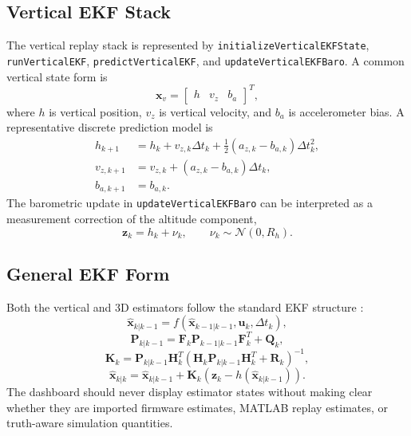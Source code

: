 \documentclass[colorlinks,upint,subscriptcorrection,varvw,hyphenate,balance]{asmeconf}
\newcommand{\code}[1]{\texttt{\allowbreak#1}}
\newcommand{\dt}{\Delta t}
\newcommand{\x}{\mathbf{x}}
\newcommand{\uvec}{\mathbf{u}}
\newcommand{\z}{\mathbf{z}}
\newcommand{\Pcov}{\mathbf{P}}
\newcommand{\Qcov}{\mathbf{Q}}
\newcommand{\Rcov}{\mathbf{R}}
\begin{document}
\subsection{Vertical EKF Stack}
The vertical replay stack is represented by \code{initializeVerticalEKFState}, \code{runVerticalEKF}, \code{predictVerticalEKF}, and \code{updateVerticalEKFBaro}. A common vertical state form is
\begin{equation}
\x_v =
\begin{bmatrix}
h & v_z & b_a
\end{bmatrix}^T,
\label{eq:vertical_state}
\end{equation}
where $h$ is vertical position, $v_z$ is vertical velocity, and $b_a$ is accelerometer bias. A representative discrete prediction model is
\begin{equation}
\begin{aligned}
h_{k+1} &= h_k + v_{z,k}\dt_k + \frac{1}{2}(a_{z,k}-b_{a,k})\dt_k^2,\\
v_{z,k+1} &= v_{z,k} + (a_{z,k}-b_{a,k})\dt_k,\\
b_{a,k+1} &= b_{a,k}.
\end{aligned}
\label{eq:vertical_predict}
\end{equation}
The barometric update in \code{updateVerticalEKFBaro} can be interpreted as a measurement correction of the altitude component,
\begin{equation}
\z_k = h_k + \nu_k,
\qquad
\nu_k \sim \mathcal{N}(0,R_h).
\label{eq:baro_update}
\end{equation}

\subsection{General EKF Form}
Both the vertical and 3D estimators follow the standard EKF structure \cite{welch}:
\begin{equation}
\hat{\x}_{k|k-1}=f(\hat{\x}_{k-1|k-1},\uvec_k,\dt_k),
\label{eq:ekf_predict_state}
\end{equation}
\begin{equation}
\Pcov_{k|k-1}=\mathbf{F}_k\Pcov_{k-1|k-1}\mathbf{F}_k^T+\Qcov_k,
\label{eq:ekf_predict_cov}
\end{equation}
\begin{equation}
\mathbf{K}_k=\Pcov_{k|k-1}\mathbf{H}_k^T
\left(\mathbf{H}_k\Pcov_{k|k-1}\mathbf{H}_k^T+\Rcov_k\right)^{-1},
\label{eq:kalman_gain}
\end{equation}
\begin{equation}
\hat{\x}_{k|k}=\hat{\x}_{k|k-1}+\mathbf{K}_k
\left(\z_k-h(\hat{\x}_{k|k-1})\right).
\label{eq:ekf_update}
\end{equation}
The dashboard should never display estimator states without making clear whether they are imported firmware estimates, MATLAB replay estimates, or truth-aware simulation quantities.
\end{document}
